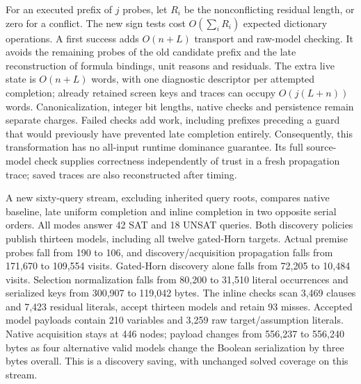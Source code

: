 \documentclass[11pt,a4paper]{article}
\numberwithin{equation}{section}
\theoremstyle{plain}
\theoremstyle{definition}
\theoremstyle{remark}
\begin{document}
For an executed prefix of $j$ probes, let $R_i$ be the nonconflicting residual
length, or zero for a conflict. The new sign tests cost $O(\sum_i R_i)$ expected dictionary operations.
A first success adds $O(n+L)$ transport and raw-model checking. It avoids the
remaining probes of the old candidate prefix and the late reconstruction of
formula bindings, unit reasons and residuals. The extra live state is
$O(n+L)$ words, with one diagnostic descriptor per attempted completion;
already retained screen keys and traces can occupy $O(j(L+n))$ words.
Canonicalization, integer bit lengths, native checks and persistence remain
separate charges. Failed checks add work, including prefixes preceding a guard
that would previously have prevented late completion entirely. Consequently,
this transformation has no all-input runtime dominance guarantee. Its full
source-model check supplies correctness independently of trust in a fresh
propagation trace; saved traces are also reconstructed after timing.

A new sixty-query stream, excluding inherited query roots, compares native
baseline, late uniform completion and inline completion in two opposite serial
orders. All modes answer 42 SAT and 18 UNSAT queries. Both discovery policies
publish thirteen models, including all twelve gated-Horn targets. Actual
premise probes fall from 190 to 106, and discovery/acquisition propagation
falls from 171,670 to 109,554 visits. Gated-Horn discovery alone falls from
72,205 to 10,484 visits. Selection normalization falls from 80,200 to 31,510
literal occurrences and serialized keys from 300,907 to 119,042 bytes.
The inline checks scan 3,469 clauses and 7,423 residual literals, accept thirteen
models and retain 93 misses. Accepted model payloads contain 210 variables and
3,259 raw target/assumption literals. Native acquisition stays at 446 nodes;
payload changes from 556,237 to 556,240 bytes as four alternative valid
models change the Boolean serialization by three bytes overall. This is a discovery saving, with unchanged
solved coverage on this stream.
\end{document}
